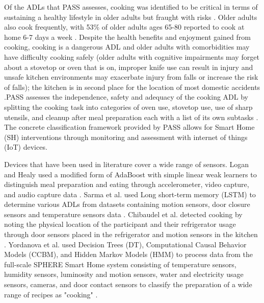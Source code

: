 Of the ADLs that PASS assesses, cooking was identified to be critical in terms of sustaining a healthy lifestyle in older adults \cite{bouchard_smart_2020} but fraught with risks \cite{yared_cooking_2015}. Older adults also cook frequently, with 53\% of older adults ages 65-80 reported to cook at home 6-7 days a week \cite{malani_joy_2020}. Despite the health benefits and enjoyment gained from cooking, cooking is a dangerous ADL and older adults with comorbidities may have difficulty cooking safely (older adults with cognitive impairments may forget about a stovetop or oven that is on, improper knife use can result in injury and unsafe kitchen environments may exacerbate injury from falls or increase the risk of falls); the kitchen is in second place for the location of most domestic accidents \cite{yared_cooking_2015}.PASS assesses the independence, safety and adequacy of the cooking ADL by splitting the cooking task into categories of oven use, stovetop use, use of sharp utensils, and cleanup after meal preparation each with a list of its own subtasks \cite{rogers_performance_2014}. The concrete classification framework provided by PASS allows for Smart Home (SH) interventions through monitoring and assessment with internet of things (IoT) devices.

Devices that have been used in literature cover a wide range of sensors. Logan and Healy used a modified form of AdaBoost with simple linear weak learners to distinguish meal preparation and eating through accelerometer, video capture, and audio capture data \cite{logan_sensors_2006}. Sarma et al. used Long short-term memory (LSTM) to determine various ADLs from datasets containing motion sensors, door closure sensors and temperature sensors data \cite{sarma_activity_2019}. Chibaudel et al. detected cooking by noting the physical location of the participant and their refrigerator usage through door sensors placed in the refrigerator and motion sensors in the kitchen \cite{mokhtari_smart_2018}. Yordanova et al. used Decision Trees (DT), Computational Causal Behavior Models (CCBM), and Hidden Markov Models (HMM) to process data from the full-scale SPHERE Smart Home system consisting of temperature sensors, humidity sensors, luminosity and motion sensors, water and electricity usage sensors, cameras, and door contact sensors to classify the preparation of a wide range of recipes as "cooking" \cite{yordanova_analysing_2019}.

